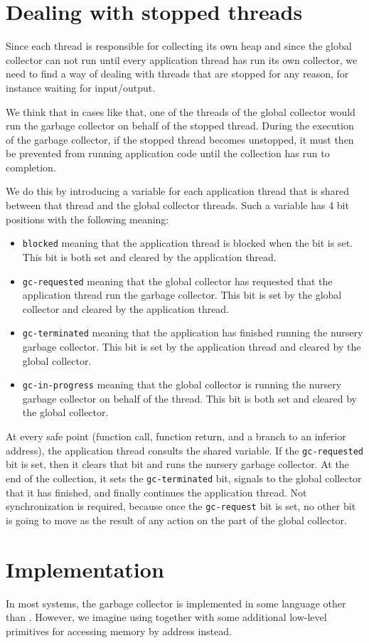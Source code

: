\section{Dealing with stopped threads}

Since each thread is responsible for collecting its own heap and since
the global collector can not run until every application thread has
run its own collector, we need to find a way of dealing with threads
that are stopped for any reason, for instance waiting for
input/output.

We think that in cases like that, one of the threads of the global
collector would run the garbage collector on behalf of the stopped
thread.  During the execution of the garbage collector, if the stopped
thread becomes unstopped, it must then be prevented from running
application code until the collection has run to completion.

We do this by introducing a variable for each application thread that
is shared between that thread and the global collector threads.  Such
a variable has 4 bit positions with the following meaning:

\begin{itemize}
\item \texttt{blocked} meaning that the application thread is blocked
  when the bit is set.  This bit is both set and cleared by the
  application thread.
\item \texttt{gc-requested} meaning that the global collector has
  requested that the application thread run the garbage collector.
  This bit is set by the global collector and cleared by the
  application thread.
\item \texttt{gc-terminated} meaning that the application has finished
  running the nursery garbage collector.  This bit is set by the
  application thread and cleared by the global collector.
\item \texttt{gc-in-progress} meaning that the global collector is
  running the nursery garbage collector on behalf of the thread.  This
  bit is both set and cleared by the global collector.
\end{itemize}

At every safe point (function call, function return, and a branch to
an inferior address), the application thread consults the shared
variable.  If the \texttt{gc-requested} bit is set, then it clears
that bit and runs the nursery garbage collector.  At the end of the
collection, it sets the \texttt{gc-terminated} bit, signals to the
global collector that it has finished, and finally continues the
application thread.  Not synchronization is required, because once the
\texttt{gc-request} bit is set, no other bit is going to move as the
result of any action on the part of the global collector.

\section{Implementation}

In most systems, the garbage collector is implemented in some language
other than \commonlisp{}.  However, we imagine using \commonlisp{}
together with some additional low-level primitives for accessing
memory by address instead.

